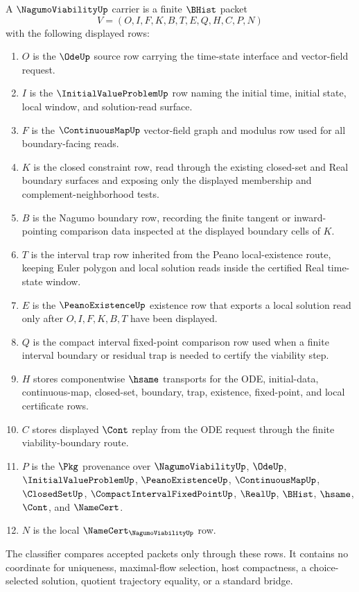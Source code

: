 \begin{definition}\label{def:nagumo-viability-carrier}
A $\NagumoViabilityUp$ carrier is a finite $\BHist$ packet
$$
V=(O,I,F,K,B,T,E,Q,H,C,P,N)
$$
with the following displayed rows:
\begin{enumerate}
\item $O$ is the $\OdeUp$ source row carrying the time-state interface and vector-field request.
\item $I$ is the $\InitialValueProblemUp$ row naming the initial time, initial state, local window, and solution-read surface.
\item $F$ is the $\ContinuousMapUp$ vector-field graph and modulus row used for all boundary-facing reads.
\item $K$ is the closed constraint row, read through the existing closed-set and Real boundary surfaces and exposing only the displayed membership and complement-neighborhood tests.
\item $B$ is the Nagumo boundary row, recording the finite tangent or inward-pointing comparison data inspected at the displayed boundary cells of $K$.
\item $T$ is the interval trap row inherited from the Peano local-existence route, keeping Euler polygon and local solution reads inside the certified Real time-state window.
\item $E$ is the $\PeanoExistenceUp$ existence row that exports a local solution read only after $O,I,F,K,B,T$ have been displayed.
\item $Q$ is the compact interval fixed-point comparison row used when a finite interval boundary or residual trap is needed to certify the viability step.
\item $H$ stores componentwise $\hsame$ transports for the ODE, initial-data, continuous-map, closed-set, boundary, trap, existence, fixed-point, and local certificate rows.
\item $C$ stores displayed $\Cont$ replay from the ODE request through the finite viability-boundary route.
\item $P$ is the $\Pkg$ provenance over $\NagumoViabilityUp$, $\OdeUp$, $\InitialValueProblemUp$, $\PeanoExistenceUp$, $\ContinuousMapUp$, $\ClosedSetUp$, $\CompactIntervalFixedPointUp$, $\RealUp$, $\BHist$, $\hsame$, $\Cont$, and $\NameCert$.
\item $N$ is the local $\NameCert_{\NagumoViabilityUp}$ row.
\end{enumerate}
The classifier compares accepted packets only through these rows. It contains no coordinate for uniqueness, maximal-flow selection, host compactness, a choice-selected solution, quotient trajectory equality, or a standard bridge.
\end{definition}


